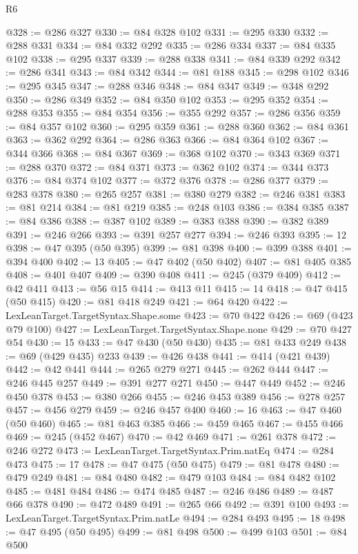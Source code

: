 \begin{lexlean}{R6}
\begin{coremodule}
@328 := @286 @327
@330 := @84 @328 @102
@331 := @295 @330
@332 := @288 @331
@334 := @84 @332 @292
@335 := @286 @334
@337 := @84 @335 @102
@338 := @295 @337
@339 := @288 @338
@341 := @84 @339 @292
@342 := @286 @341
@343 := @84 @342
@344 := @81 @188
@345 := @298 @102
@346 := @295 @345
@347 := @288 @346
@348 := @84 @347
@349 := @348 @292
@350 := @286 @349
@352 := @84 @350 @102
@353 := @295 @352
@354 := @288 @353
@355 := @84 @354
@356 := @355 @292
@357 := @286 @356
@359 := @84 @357 @102
@360 := @295 @359
@361 := @288 @360
@362 := @84 @361
@363 := @362 @292
@364 := @286 @363
@366 := @84 @364 @102
@367 := @344 @366
@368 := @84 @367
@369 := @368 @102
@370 := @343 @369
@371 := @288 @370
@372 := @84 @371
@373 := @362 @102
@374 := @344 @373
@376 := @84 @374 @102
@377 := @372 @376
@378 := @286 @377
@379 := @283 @378
@380 := @265 @257
@381 := @380 @279
@382 := @246 @381
@383 := @81 @214
@384 := @81 @219
@385 := @248 @103
@386 := @384 @385
@387 := @84 @386
@388 := @387 @102
@389 := @383 @388
@390 := @382 @389
@391 := @246 @266
@393 := @391 @257 @277
@394 := @246 @393
@395 := 12
@398 := @47 @395 (@50 @395)
@399 := @81 @398
@400 := @399 @388
@401 := @394 @400
@402 := 13
@405 := @47 @402 (@50 @402)
@407 := @81 @405 @385
@408 := @401 @407
@409 := @390 @408
@411 := @245 (@379 @409)
@412 := @42 @411
@413 := @56 @15
@414 := @413 @11
@415 := 14
@418 := @47 @415 (@50 @415)
@420 := @81 @418 @249
@421 := @64 @420
@422 := LexLeanTarget.TargetSyntax.Shape.some
@423 := @70 @422
@426 := @69 (@423 @79 @100)
@427 := LexLeanTarget.TargetSyntax.Shape.none
@429 := @70 @427 @54
@430 := 15
@433 := @47 @430 (@50 @430)
@435 := @81 @433 @249
@438 := @69 (@429 @435) @233
@439 := @426 @438
@441 := @414 (@421 @439)
@442 := @42 @441
@444 := @265 @279 @271
@445 := @262 @444
@447 := @246 @445 @257
@449 := @391 @277 @271
@450 := @447 @449
@452 := @246 @450 @378
@453 := @380 @266
@455 := @246 @453 @389
@456 := @278 @257
@457 := @456 @279
@459 := @246 @457 @400
@460 := 16
@463 := @47 @460 (@50 @460)
@465 := @81 @463 @385
@466 := @459 @465
@467 := @455 @466
@469 := @245 (@452 @467)
@470 := @42 @469
@471 := @261 @378
@472 := @246 @272
@473 := LexLeanTarget.TargetSyntax.Prim.natEq
@474 := @284 @473
@475 := 17
@478 := @47 @475 (@50 @475)
@479 := @81 @478
@480 := @479 @249
@481 := @84 @480
@482 := @479 @103
@484 := @84 @482 @102
@485 := @481 @484
@486 := @474 @485
@487 := @246 @486
@489 := @487 @66 @378
@490 := @472 @489
@491 := @265 @66
@492 := @391 @100
@493 := LexLeanTarget.TargetSyntax.Prim.natLe
@494 := @284 @493
@495 := 18
@498 := @47 @495 (@50 @495)
@499 := @81 @498
@500 := @499 @103
@501 := @84 @500

\end{coremodule}
\end{lexlean}

